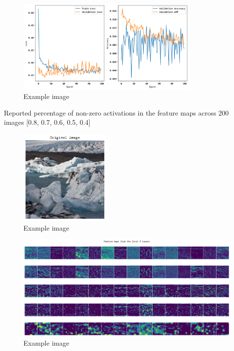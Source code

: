 \documentclass[twocolumn]{article}[9pt]
\begin{document}
\begin{figure}[!ht]
    \centering
    \includegraphics[width=0.8\textwidth]{../training.png}
    \caption{Example image}
    \label{fig:training}
\end{figure}

Reported percentage of non-zero activations in the feature maps across 200 images
[0.8, 0.7, 0.6, 0.5, 0.4]

\clearpage
\begin{figure}[h]
    \centering
    \includegraphics[width=0.4\textwidth]{../original-image.png}
    \caption{Example image}
    \label{fig:original-image}
\end{figure}
\begin{figure}[h]
    \centering
    \includegraphics[width=1.0\textwidth]{../featuremaps.png}
    \caption{Example image}
    \label{fig:featuremaps}
\end{figure}
\end{document}
